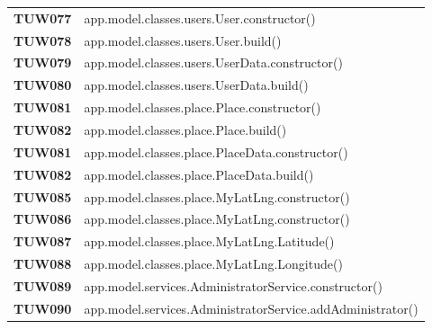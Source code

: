 \documentclass[../piano-di-qualifica.tex]{subfiles}
\begin{document}
\begin{longtable}[H]{>{\centering\bfseries}m{3cm} >{}m{13cm}}

TUW077             & app.model.classes.users.User.constructor\@()\\ 

TUW078             & app.model.classes.users.User.build\@()\\ 
 

TUW079             & app.model.classes.users.UserData.constructor\@()\\ 

TUW080             & app.model.classes.users.UserData.build\@()\\ 
 

TUW081             & app.model.classes.place.Place.constructor\@()\\ 

TUW082             & app.model.classes.place.Place.build\@()\\ 
 

TUW081             & app.model.classes.place.PlaceData.constructor\@()\\ 

TUW082             & app.model.classes.place.PlaceData.build\@()\\ 
 

TUW085              & app.model.classes.place.MyLatLng.constructor\@()\\ 

TUW086             & app.model.classes.place.MyLatLng.constructor\@()\\ 
 
TUW087             & app.model.classes.place.MyLatLng.Latitude\@()\\  

TUW088             & app.model.classes.place.MyLatLng.Longitude\@()\\ 


TUW089             & app.model.services.AdministratorService.constructor\@()\\ 

TUW090             & app.model.services.AdministratorService.addAdministrator\@()\\ 


\end{longtable}
\end{document}
